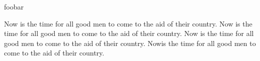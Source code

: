 \documentclass{article}
\begin{document}
foobar%

Now is the time for all good men to come to the aid of their country. Now is the time for all good men to come to the aid of their country. Now is the time for all good men to come to the aid of their country. Nowis the time for all good men to come to the aid of their country.%
\end{document}
